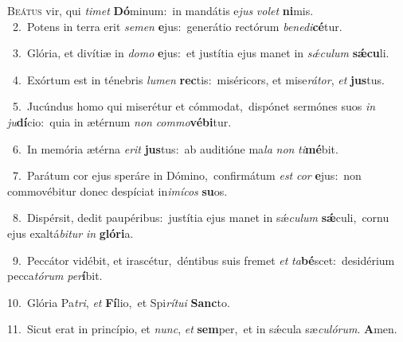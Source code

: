 \lettrine{\initial\textcolor{\initialcolor}{B}}{eátus} vir, qui \textit{ti}\-\textit{met} \textbf{Dó}\-minum:~\star in mandátis e\textit{jus} \textit{vo}\-\textit{let} \textbf{ni}\-mis.\\
{\numbfont\textcolor{\numbcolor}{~2.}}~Potens in terra erit \textit{se}\-\textit{men} \textbf{e}\-jus:~\star generátio rectórum \textit{be}\-\textit{ne}\textit{di}\textbf{cé}tur.\par
{\numbfont\textcolor{\numbcolor}{~3.}}~Glória, et divítiæ in \textit{do}\-\textit{mo} \textbf{e}\-jus:~\star et justítia ejus manet in \textit{sǽ}\-\textit{cu}\textit{lum} \textbf{sǽ}\-\textbf{cu}li.\par
{\numbfont\textcolor{\numbcolor}{~4.}}~Exórtum est in ténebris \textit{lu}\-\textit{men} \textbf{rec}\-tis:~\star miséricors, et mise\-\textit{rá}\-\textit{tor}, \textit{et} \textbf{jus}\-tus.\par
{\numbfont\textcolor{\numbcolor}{~5.}}~Jucúndus homo qui miserétur et cómmodat,~\dagger dispónet sermónes suos \textit{in} \textit{ju}\-\textbf{dí}cio:~\star quia in ætérnum \textit{non} \textit{com}\-\textit{mo}\textbf{vé}\textbf{bi}tur.\par
{\numbfont\textcolor{\numbcolor}{~6.}}~In memória ætérna \textit{e}\-\textit{rit} \textbf{jus}\-tus:~\star ab auditióne ma\textit{la} \textit{non} \textit{ti}\-\textbf{mé}bit.\par
{\numbfont\textcolor{\numbcolor}{~7.}}~Parátum cor ejus speráre in Dómino,~\dagger confirmátum \textit{est} \textit{cor} \textbf{e}\-jus:~\star non commovébitur donec despíciat in\-\textit{i}\-\textit{mí}\textit{cos} \textbf{su}\-os.\par
{\numbfont\textcolor{\numbcolor}{~8.}}~Dispérsit, dedit paupéribus:~\dagger justítia ejus manet in sǽ\-\textit{cu}\-\textit{lum} \textbf{sǽ}\-culi,~\star cornu ejus exaltá\-\textit{bi}\-\textit{tur} \textit{in} \textbf{gló}\-\textbf{ri}a.\par
{\numbfont\textcolor{\numbcolor}{~9.}}~Peccátor vidébit, et irascétur,~\dagger déntibus suis fremet \textit{et} \textit{ta}\-\textbf{bé}scet:~\star desidérium pecca\-\textit{tó}\-\textit{rum} \textit{per}\-\textbf{í}bit.\par
{\numbfont\textcolor{\numbcolor}{10.}}~Glória Pa\-\textit{tri}\-, \textit{et} \textbf{Fí}\-lio,~\star et Spi\-\textit{rí}\-\textit{tu}\textit{i} \textbf{Sanc}\-to.\par
{\numbfont\textcolor{\numbcolor}{11.}}~Sicut erat in princípio, et \textit{nunc}\-, \textit{et} \textbf{sem}\-per,~\star et in sǽcula sæ\-\textit{cu}\-\textit{ló}\textit{rum}. \textbf{A}\-men.\par
